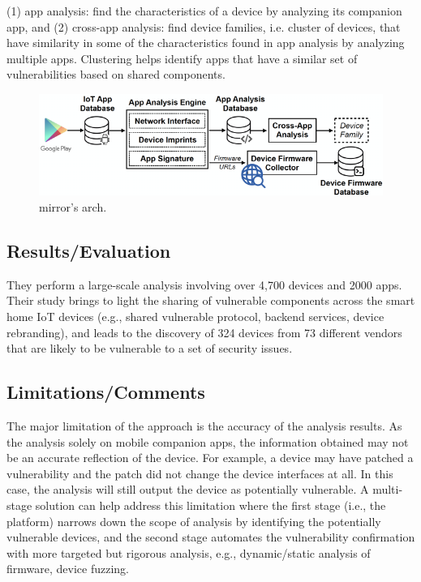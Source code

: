 (1) app analysis: find the characteristics of a device by analyzing its companion app, and (2) cross-app analysis: find device families, i.e. cluster of devices, that have similarity in some of the characteristics found in app analysis by analyzing multiple apps. Clustering helps identify apps that have a similar set of vulnerabilities based on shared components.
\begin{figure}[h]
    \centering
    \includegraphics[width=\linewidth]{mirror.png} %
    \caption{mirror's arch.}	
    \label{fig:mirror}
\end{figure}
\subsection{Results/Evaluation}
They perform a large-scale analysis involving over 4,700 devices and  2000 apps. Their study brings to light the sharing of vulnerable components across the smart home IoT devices (e.g., shared vulnerable protocol, backend services, device rebranding), and leads to the discovery of 324 devices from 73 different vendors that are likely to be vulnerable to a set of security issues.

\subsection{Limitations/Comments}
The major limitation of the approach is the accuracy of the analysis results. As the analysis solely on mobile companion apps, the information obtained may not be an accurate reflection of the device. For example, a device may have patched a vulnerability and the patch did not change the device interfaces at all. In this case, the analysis will still output the device as potentially vulnerable. A multi-stage solution can help address this limitation where the first stage (i.e., the platform) narrows down the scope of analysis by identifying the potentially vulnerable devices, and the second stage automates the vulnerability confirmation with more targeted but rigorous analysis, e.g., dynamic/static analysis of firmware, device fuzzing.

